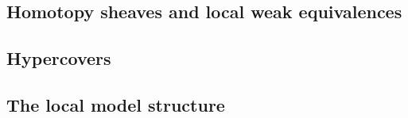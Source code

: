 \begin{refsection}
\subsection{Homotopy sheaves and local weak equivalences}

\subsection{Hypercovers}

\subsection{The local model structure}

%
%
%
%
%
%

\end{refsection}
